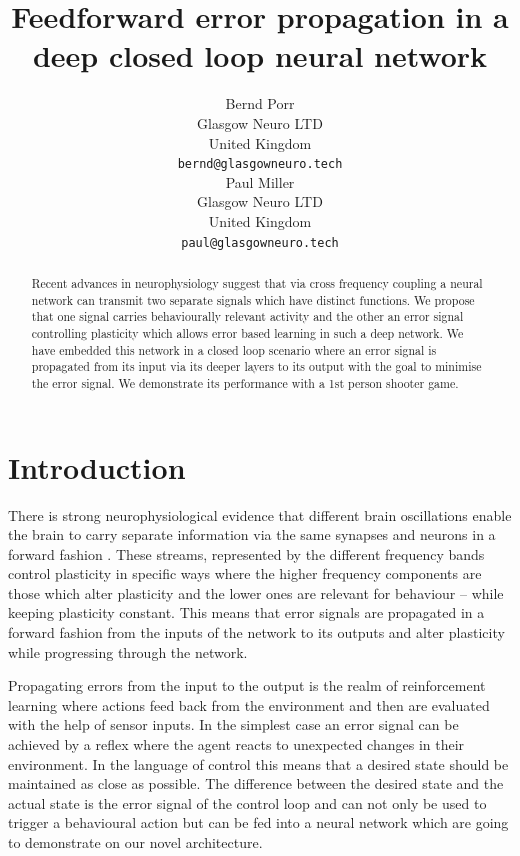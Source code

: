 \documentclass{article}
\title{Feedforward error propagation in a deep closed loop neural network}
\author{
  Bernd Porr\\
  Glasgow Neuro LTD\\
  United Kingdom\\
  \texttt{bernd@glasgowneuro.tech} \\
  Paul Miller \\
  Glasgow Neuro LTD \\
  United Kingdom \\
  \texttt{paul@glasgowneuro.tech}
}
\begin{document}
\maketitle

\begin{abstract}
  Recent advances in neurophysiology suggest that via cross frequency
  coupling a neural network can transmit two separate signals which
  have distinct functions. We propose that one signal carries
  behaviourally relevant activity and the other an error signal
  controlling plasticity which allows error based learning in such a
  deep network. We have embedded this network in a closed loop
  scenario where an error signal is propagated from its input via its
  deeper layers to its output with the goal to minimise the error
  signal. We demonstrate its performance with a 1st person shooter
  game.
\end{abstract}

\section{Introduction}
There is strong neurophysiological evidence that different brain
oscillations enable the brain to carry separate information via the
same synapses and neurons in a forward fashion
\cite{Canolty2010}. These streams, represented by the different
frequency bands control plasticity in specific ways where the higher
frequency components are those which alter plasticity \cite{Bliss73}
and the lower ones are relevant for behaviour \cite{Luescher2012} --
while keeping plasticity constant. This means that error signals are
propagated in a forward fashion from the inputs of the network to its
outputs and alter plasticity while progressing through the network.

Propagating errors from the input to the output is the realm of
reinforcement learning where actions feed back from the environment
and then are evaluated with the help of sensor
inputs\cite{Verschure91,Dayan1992,Sutton88,Sutton98,PorrNecoInvco2003,Woergoetter2005}. In
the simplest case an error signal can be achieved by a reflex
\cite{Verschure91,PorrNecoInvco2003} where the agent reacts to
unexpected changes in their environment. In the language of control
\cite{Phillips2000} this means that a desired state should be
maintained as close as possible. The difference between the desired
state and the actual state is the error signal of the control loop and
can not only be used to trigger a behavioural action but can be fed
into a neural network which are going to demonstrate on our novel
architecture.
\end{document}
